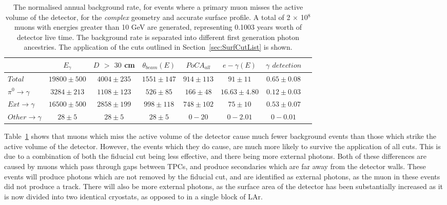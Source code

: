 \begin{table}
  \caption[The normalised annual background rate, for events where a primary muon misses the active volume of the detector, for the \emph{complex} geometry and accurate surface profile]
          {The normalised annual background rate, for events where a primary muon misses the active volume of the detector, for the \emph{complex} geometry and accurate surface profile. A total of 2 $\times$ 10$^8$ muons with energies greater than 10 GeV are generated, representing 0.1003 years worth of detector live time. The background rate is separated into different first generation photon ancestries. The application of the cuts outlined in Section~\ref{sec:SurfCutList} is shown.}
  \label{tab:SurfMuMissComp}
  \centering
  \scriptsize
  \begin{tabular}{l c c c c c c c }
    \toprule
        & $E_\gamma$ &  $D$ $>$ $30$ cm & $\theta_{beam}(E)$ & $PoCA_{all}$ & $e-\gamma(E)$ & $\gamma$ $detection$ \\
        \midrule
        $Total$          & $19800\pm500$ & $4004\pm235$ & $1551\pm147$ & $914\pm113$ & $91\pm11$      & $0.65\pm0.08$ \\

        $\pi^0\to\gamma$ & $3284\pm213$  & $1108\pm123$ & $526\pm85$   & $166\pm48$  & $16.63\pm4.80$ & $0.12\pm0.03$ \\

        $Ext\to\gamma$   & $16500\pm500$ & $2858\pm199$ & $998\pm118$  & $748\pm102$ & $75\pm10$      & $0.53\pm0.07$ \\

        $Other\to\gamma$ & $28\pm5$      & $28\pm5$     & $28\pm5$     & $0-20$      & $0-2.01$       & $0-0.01$ \\
        \bottomrule
  \end{tabular}
\end{table}

Table~\ref{tab:SurfMuMissComp} shows that muons which miss the active volume of the detector cause much fewer background events than those which strike the active volume of the detector. However, the events which they do cause, are much more likely to survive the application of all cuts. This is due to a combination of both the fiducial cut being less effective, and there being more external photons. Both of these differences are caused by muons which pass through gaps between TPCs, and produce secondaries which are far away from the detector walls. These events will produce photons which are not removed by the fiducial cut, and are identified as external photons, as the muon in these events did not produce a track. There will also be more external photons, as the surface area of the detector has been substantially increased as it is now divided into two identical cryostats, as opposed to in a single block of LAr. \\

